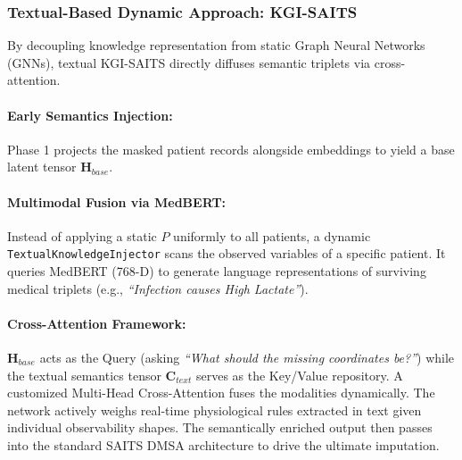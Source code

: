 \subsubsection{Textual-Based Dynamic Approach: KGI-SAITS}
By decoupling knowledge representation from static Graph Neural Networks (GNNs), textual KGI-SAITS directly diffuses semantic triplets via cross-attention.

\paragraph{Early Semantics Injection:} Phase 1 projects the masked patient records alongside embeddings to yield a base latent tensor $\mathbf{H}_{base}$.
\paragraph{Multimodal Fusion via MedBERT:} Instead of applying a static $P$ uniformly to all patients, a dynamic \texttt{TextualKnowledgeInjector} scans the observed variables of a specific patient. It queries MedBERT (768-D) to generate language representations of surviving medical triplets (e.g., \textit{``Infection causes High Lactate''}). 
\paragraph{Cross-Attention Framework:} $\mathbf{H}_{base}$ acts as the Query (asking \textit{``What should the missing coordinates be?''}) while the textual semantics tensor $\mathbf{C}_{text}$ serves as the Key/Value repository. A customized Multi-Head Cross-Attention fuses the modalities dynamically. The network actively weighs real-time physiological rules extracted in text given individual observability shapes. The semantically enriched output then passes into the standard SAITS DMSA architecture to drive the ultimate imputation.
